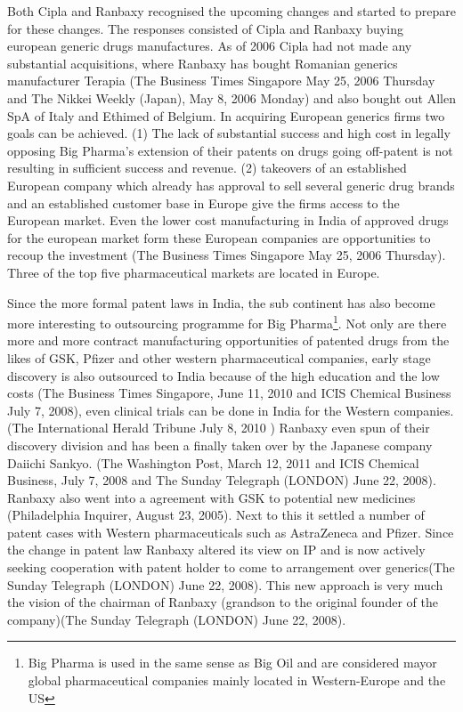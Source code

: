 Both Cipla and Ranbaxy recognised the upcoming changes and started to prepare for these changes.
The responses consisted of Cipla and Ranbaxy buying european generic drugs manufactures. 
As of 2006 Cipla had not made any substantial acquisitions, where Ranbaxy has bought Romanian generics manufacturer Terapia (The Business Times Singapore May 25, 2006 Thursday and The Nikkei Weekly (Japan), May 8, 2006 Monday) and also bought out Allen SpA of Italy and Ethimed of Belgium.
In acquiring European generics firms two goals can be achieved.
(1) The lack of substantial success and high cost in legally opposing Big Pharma's extension of their patents on drugs going off-patent is not resulting in sufficient success and revenue.
(2) takeovers of an established European company which already has approval to sell several generic drug brands and an established customer base in Europe give the firms access to the European market.
Even the lower cost manufacturing in India of approved drugs for the european market  form these European companies are opportunities to recoup the investment
(The Business Times Singapore May 25, 2006 Thursday).
Three of the top five pharmaceutical markets are located in Europe.

Since the more formal patent laws in India, the sub continent has also become more interesting to outsourcing programme for Big Pharma\footnote{Big Pharma is used in the same sense as Big Oil and are considered mayor global pharmaceutical companies mainly located in Western-Europe and the US}.
Not only are there more and more contract manufacturing opportunities of patented drugs from the likes of GSK, Pfizer and other western pharmaceutical companies, early stage discovery is also outsourced to India because of the high education and the low costs (The Business Times Singapore, June 11, 2010 and ICIS Chemical Business July 7, 2008), even clinical trials can be done in India for the Western companies.(The International Herald Tribune July 8, 2010 )
Ranbaxy even spun of their discovery division and has been a finally taken over by the Japanese company Daiichi Sankyo. (The Washington Post, March 12, 2011 and ICIS Chemical Business, July 7, 2008 and The Sunday Telegraph (LONDON) June 22, 2008).
Ranbaxy also went into a agreement with GSK to potential new medicines (Philadelphia Inquirer, August 23, 2005).
Next to this it settled a number of patent cases with Western pharmaceuticals such as AstraZeneca and Pfizer.
Since the change in patent law Ranbaxy altered its view on \gls{IP} and is now actively seeking cooperation with patent holder to come to arrangement over generics(The Sunday Telegraph (LONDON) June 22, 2008).
This new approach is very much the vision of the chairman of Ranbaxy (grandson to the original founder of the company)(The Sunday Telegraph (LONDON) June 22, 2008).


